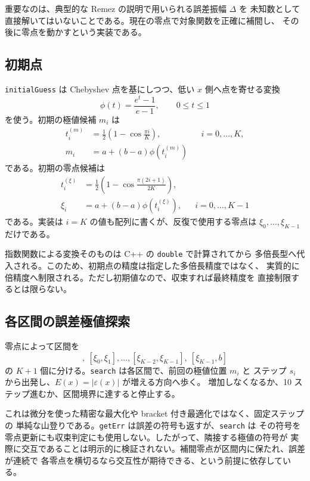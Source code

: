 \documentclass[a4paper,11pt]{ltjsarticle}
\newcommand{\code}[1]{\texttt{#1}}
\newcommand{\RelErr}{\varepsilon}
\begin{document}
重要なのは、典型的な Remez の説明で用いられる誤差振幅 \(\Delta\) を
未知数として直接解いてはいないことである。現在の零点で対象関数を正確に補間し、
その後に零点を動かすという実装である。

\subsection{初期点}

\code{initialGuess} は Chebyshev 点を基にしつつ、低い \(x\) 側へ点を寄せる変換
\begin{equation}
  \phi(t)=\frac{e^t-1}{e-1},\qquad 0\leq t\leq 1
  \label{eq:warp}
\end{equation}
を使う。初期の極値候補 \(m_i\) は
\begin{align}
 t_i^{(m)} &= \frac{1}{2}\left(1-\cos\frac{\pi i}{K}\right),
       &&i=0,\ldots,K,\\
 m_i &= a+(b-a)\phi\!\left(t_i^{(m)}\right)
 \end{align}
である。初期の零点候補は
\begin{align}
 t_i^{(\xi)} &= \frac{1}{2}\left(1-
       \cos\frac{\pi(2i+1)}{2K}\right),\\
 \xi_i &= a+(b-a)\phi\!\left(t_i^{(\xi)}\right),
       &&i=0,\ldots,K-1
 \end{align}
である。実装は \(i=K\) の値も配列に書くが、反復で使用する零点は
\(\xi_0,\ldots,\xi_{K-1}\) だけである。

指数関数による変換そのものは C++ の \code{double} で計算されてから
多倍長型へ代入される。このため、初期点の精度は指定した多倍長精度ではなく、
実質的に倍精度へ制限される。ただし初期値なので、収束すれば最終精度を
直接制限するとは限らない。

\subsection{各区間の誤差極値探索}

零点によって区間を
\begin{equation}
 [a,\xi_0],\ [\xi_0,\xi_1],\ldots,
 [\xi_{K-2},\xi_{K-1}],\ [\xi_{K-1},b]
\end{equation}
の \(K+1\) 個に分ける。\code{search} は各区間で、前回の極値位置 \(m_i\) と
ステップ \(s_i\) から出発し、\(E(x)=|\RelErr(x)|\) が増える方向へ歩く。
増加しなくなるか、10 ステップ進むか、区間境界に達すると停止する。

これは微分を使った精密な最大化や bracket 付き最適化ではなく、固定ステップの
単純な山登りである。\code{getErr} は誤差の符号も返すが、\code{search} は
その符号を零点更新にも収束判定にも使用しない。したがって、隣接する極値の符号が
実際に交互であることは明示的に検証されない。補間零点が区間内に保たれ、誤差が連続で
各零点を横切るなら交互性が期待できる、という前提に依存している。
\end{document}
